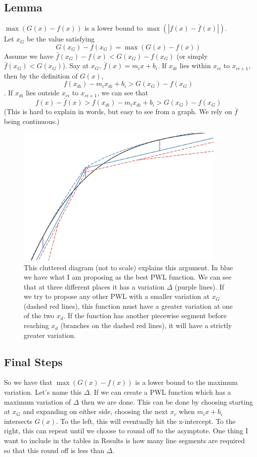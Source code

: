 \documentclass[a4paper,10pt,preprint,3p,hidelinks]{elsarticle}
\begin{document}
	\subsection{Lemma}
	$\max(G(x) - f(x))$ is a lower bound to $\max(|f(x) - \bar{f}(x)|)$.\\
	
	Let $x_G$ be the value satisfying
	\[G(x_G) - f(x_G) = \max(G(x) - f(x))\]
	Assume we have $\bar{f}(x_G) - f(x) < G(x_G) - f(x_G)$ (or simply $\bar{f}(x_G) < G(x_G)$). Say at $x_G$, $\bar{f}(x) = m_ix+b_i$. If $x_{di}$ lies within $x_{ci}$ to $x_{ci+1}$, then by the definition of $G(x)$,
	\[f(x_{di}) - m_ix_{di}+b_i > G(x_G) - f(x_G)\].
	If $x_{di}$ lies outside $x_{ci}$ to $x_{ci+1}$, we can see that
	\[f(x) - \bar{f}(x) > f(x_{di}) - m_ix_{di}+b_i > G(x_G) - f(x_G)\]
	(This is hard to explain in words, but easy to see from a graph. We rely on $\bar{f}$ being continuous.)
	\begin{figure}[H]
		\centering
		\includegraphics[width=4in]{figures/big-G-figure.png}
		\caption{This cluttered diagram (not to scale) explains this argument. In blue we have what I am proposing as the best PWL function. We can see that at three different places it has a variation $\Delta$ (purple lines). If we try to propose any other PWL with a smaller variation at $x_G$ (dashed red lines), this function must have a greater variation at one of the two $x_d$. If the function has another piecewise segment before reaching $x_d$ (branches on the dashed red lines), it will have a strictly greater variation.}
		\label{fig:G(x) and explanation of argument}
	\end{figure}
	\subsection{Final Steps}
	So we have that $\max(G(x) - f(x))$ is a lower bound to the maximum variation. Let's name this $\Delta$. If we can create a PWL function which has a maximum variation of $\Delta$ then we are done. This can be done by choosing starting at $x_G$ and expanding on either side, choosing the next $x_{c}$ when $m_ix+b_i$ intersects $G(x)$. To the left, this will eventually hit the x-intercept. To the right, this can repeat until we choose to round off to the asymptote. One thing I want to include in the tables in Results is how many line segments are required so that this round off is less than $\Delta$. 
	
\end{document}
